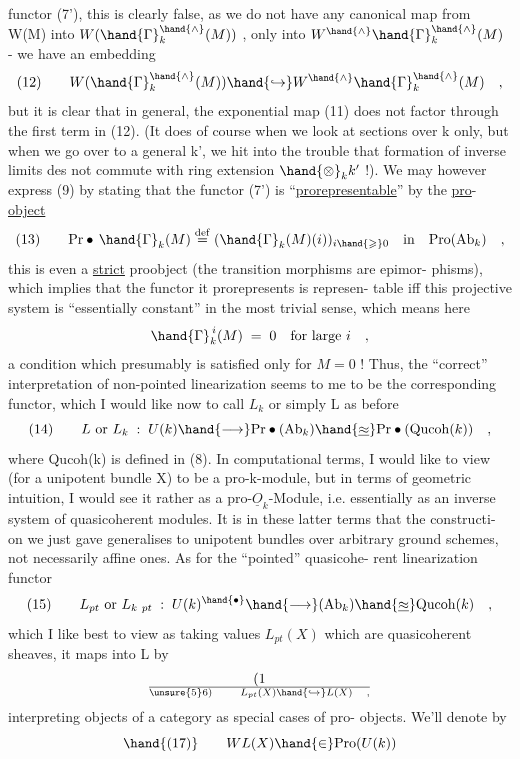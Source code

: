 functor (7'), this is clearly false, as we do not have any canonical
map from W(M) into $W(\hand{\Gamma}_k^{\hand{\wedge}}(M))$ , only into $W^{\hand{\wedge}}\hand{\Gamma}_k^{\hand{\wedge}}(M)$  - we have an
embedding
\[ (12) \qquad W(\hand{\Gamma}_k^{\hand{\wedge}}(M)) \hand{\hookrightarrow} W^{\hand{\wedge}}\hand{\Gamma}_k^{\hand{\wedge}}(M) \quad , \]
but it is clear that in general, the exponential map (11) does not
factor through the first term in (12). (It does of course when we look
at sections over k only, but when we go over to a general k', we hit
into the trouble that formation of inverse limits des not commute with
ring extension $\hand{\otimes}_k k'$ !). We may however express (9) by stating that the
functor (7') is ``\uline{prorepresentable}'' by the \uline{pro}-\uline{object}
\[ (13) \qquad \mathrm{Pr}\bullet\, \hand{\Gamma}_k(M) \overset{\mathrm{def}}{=} (\hand{\Gamma}_k(M)(i))_{i \hand{\geqslant} 0} \quad \text{in} \quad \mathrm{Pro}(\mathrm{Ab}_k) \quad , \]
this is even a \uline{strict} proobject (the transition morphisms are epimor-%
phisms), which implies that the functor it prorepresents is represen-%
table iff this projective system is ``essentially constant'' in the most
trivial sense, which means here
\[ \hand{\Gamma}_k^{\,i}(M) \;=\; 0 \quad \text{for large } i \quad , \]
a condition which presumably is satisfied only for $M=0$ ! Thus, the
``correct'' interpretation of non-pointed  linearization seems to me to
be the corresponding functor, which I would like now to call $L_k$ or
simply L as before 
\[ (14) \qquad L \text{ or } L_k \;:\; U(k) \hand{\longrightarrow} \mathrm{Pr}\bullet(\mathrm{Ab}_k) \hand{\underline{\approx}} \mathrm{Pr}\bullet(\mathrm{Qucoh}(k)) \quad , \]
where  Qucoh(k) is defined in (8). In computational terms, I
would like to view  (for a unipotent bundle X)  to be a
pro-k-module, but in terms of geometric intuition, I would see it
rather as a pro-$\underline{O}_k$-Module, i.e. essentially as an inverse system of
quasicoherent modules. It is in these latter terms that the constructi-%
on we just gave generalises to unipotent bundles over arbitrary ground
schemes, not necessarily affine ones. As for the ``pointed'' quasicohe-%
rent linearization functor
\[ (15) \qquad L_{pt} \text{ or } L_{k\ pt} \;:\; U(k)^{\hand{\bullet}} \hand{\longrightarrow} (\mathrm{Ab}_k) \hand{\underline{\approx}} \mathrm{Qucoh}(k) \quad , \]
which I like best to view as taking values $L_{pt}(X)$ which are quasicoherent
sheaves, it maps into L by
\[ (1\over{\unsure{5}}{6}) \qquad L_{pt}(X) \hand{\hookrightarrow} L(X) \quad , \]
interpreting objects of  a category as special cases of pro-%
objects. We'll denote by
\[ \hand{(17)} \qquad WL(X) \hand{\in} \mathrm{Pro}(U(k)) \]

